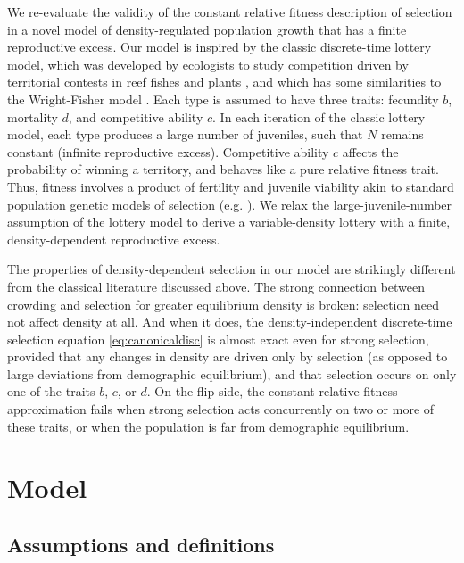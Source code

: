 \documentclass[12pt]{article}
\begin{document}
We re-evaluate the validity of the constant relative fitness description of selection in a novel model of density-regulated population growth that has a finite reproductive excess. Our model is inspired by the classic discrete-time lottery model, which was developed by ecologists to study competition driven by territorial contests in reef fishes and plants \citep{sale_77,chesson_1981}, and which has some similarities to the Wright-Fisher model \citep{svardal_2015}. Each type is assumed to have three traits: fecundity $b$, mortality $d$, and competitive ability $c$. In each iteration of the classic lottery model, each type produces a large number of juveniles, such that $N$ remains constant (infinite reproductive excess). Competitive ability $c$ affects the probability of winning a territory, and behaves like a pure relative fitness trait. Thus, fitness involves a product of fertility and juvenile viability akin to standard population genetic models of selection (e.g. \citealt[pp. 185]{crow_1970}). We relax the large-juvenile-number assumption of the lottery model to derive a variable-density lottery with a finite, density-dependent reproductive excess. 

The properties of density-dependent selection in our model are strikingly different from the classical literature discussed above. The strong connection between crowding and selection for greater equilibrium density is broken: selection need not affect density at all. And when it does, the density-independent discrete-time selection equation \eqref{eq:canonicaldisc} is almost exact even for strong selection, provided that any changes in density are driven only by selection (as opposed to large deviations from demographic equilibrium), and that selection occurs on only one of the traits $b$, $c$, or $d$. On the flip side, the constant relative fitness approximation fails when strong selection acts concurrently on two or more of these traits, or when the population is far from demographic equilibrium.

\section*{Model}\label{sec:model}

\subsection*{Assumptions and definitions} 
\end{document}
